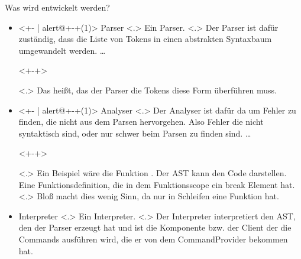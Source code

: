 \begin{frame}{Was wird entwickelt werden?}
\begin{itemize}[<+- | alert@+>]
      \item<+- | alert@+-+(1)>
        Parser%
            \note[item]<.>{
              Ein Parser.
            }
            \note[item]<.>{
              Der Parser ist dafür zuständig, dass die Liste von Tokens in einen abstrakten Syntaxbaum umgewandelt werden.
              \ldots
            }%
        \begin{uncoverenv}<+-+>%
        \end{uncoverenv}%
            \note[item]<.>{
              Das heißt, das der Parser die Tokens diese Form überführen muss.
            }%
      \item<+- | alert@+-+(1)>
        Analyser%
            \note[item]<.>{
              Der Analyser ist dafür da um Fehler zu finden, die nicht aus dem Parsen hervorgehen. Also Fehler die nicht syntaktisch sind, oder nur schwer beim Parsen zu finden sind.
              \ldots
            }
        \begin{uncoverenv}<+-+>%
        \end{uncoverenv}
            \note[item]<.>{
              Ein Beispiel wäre die Funktion . Der AST kann den Code darstellen. Eine Funktionsdefinition, die in dem Funktionsscope ein break Element hat.
            }
            \note[item]<.>{
              Bloß macht dies wenig Sinn, da  nur in Schleifen eine Funktion hat.
            }
      \item
        Interpreter
            \note[item]<.>{
              Ein Interpreter.
            }
            \note[item]<.>{
              Der Interpreter interpretiert den AST, den der Parser erzeugt hat und ist die Komponente bzw. der Client der die Commands ausführen wird, die er von dem CommandProvider bekommen hat.
            }
    \end{itemize}
  \end{frame}

